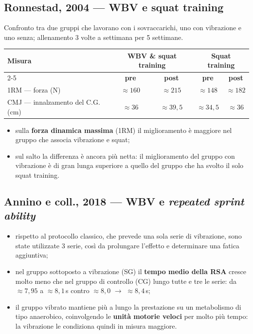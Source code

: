 \subsection{Ronnestad, 2004 --- WBV e squat training}

Confronto tra due gruppi che lavorano con i sovraccarichi, uno con vibrazione e uno senza;
allenamento 3 volte a settimana per 5 settimane.

\begin{table}[htbp]
  \centering
  \small
  \renewcommand{\arraystretch}{1.3}
  \begin{tabularx}{\textwidth}{|X|c|c|c|c|}
    \hline
    \multirow{2}{*}{\textbf{Misura}} & \multicolumn{2}{c|}{\textbf{WBV \& squat training}} &
      \multicolumn{2}{c|}{\textbf{Squat training}} \\
    \cline{2-5}
     & \textbf{pre} & \textbf{post} & \textbf{pre} & \textbf{post} \\
    \hline
    1RM --- forza (N) & $\approx 160$ & $\approx 215$ & $\approx 148$ & $\approx 182$ \\
    \hline
    CMJ --- innalzamento del C.G. (cm) & $\approx 36$ & $\approx 39{,}5$ & $\approx 34{,}5$ &
      $\approx 36$ \\
    \hline
  \end{tabularx}
\end{table}

\begin{itemize}
  \item sulla \textbf{forza dinamica massima} (1RM) il miglioramento è maggiore nel gruppo che
    associa vibrazione e squat;
  \item sul salto la differenza è ancora più netta: il miglioramento del gruppo con vibrazione è di
    gran lunga superiore a quello del gruppo che ha svolto il solo squat training.
\end{itemize}

\subsection{Annino e coll., 2018 --- WBV e \textit{repeated sprint ability}}

\begin{itemize}
  \item rispetto al protocollo classico, che prevede una sola serie di vibrazione, sono state
    utilizzate 3 serie, così da prolungare l'effetto e determinare una fatica aggiuntiva;
  \item nel gruppo sottoposto a vibrazione (SG) il \textbf{tempo medio della RSA} cresce molto meno
    che nel gruppo di controllo (CG) lungo tutte e tre le serie: da $\approx 7{,}95$ a $\approx
    8{,}1$\,s contro $\approx 8{,}0$ $\rightarrow$ $\approx 8{,}4$\,s;
  \item il gruppo vibrato mantiene più a lungo la prestazione su un metabolismo di tipo anaerobico,
    coinvolgendo le \textbf{unità motorie veloci} per molto più tempo: la vibrazione le condiziona
    quindi in misura maggiore.
\end{itemize}

